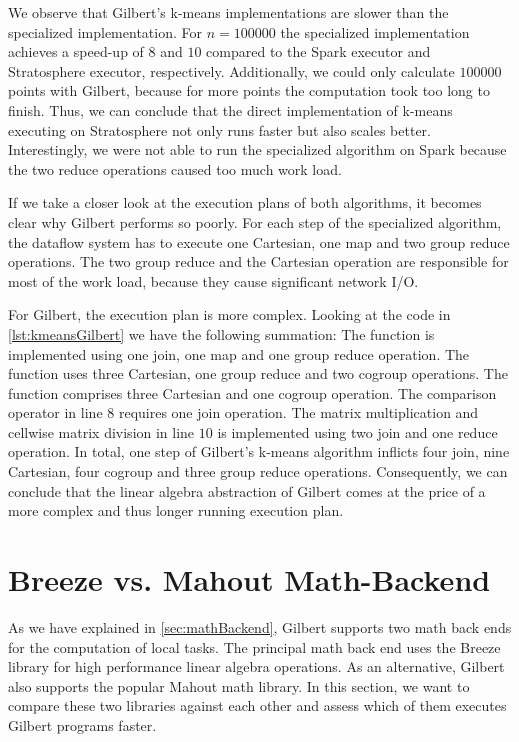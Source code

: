 We observe that Gilbert's k-means implementations are slower than the specialized implementation.
For $n=100000$ the specialized implementation achieves a speed-up of $8$ and $10$ compared to the Spark executor and Stratosphere executor, respectively.
Additionally, we could only calculate $100000$ points with Gilbert, because for more points the computation took too long to finish.
Thus, we can conclude that the direct implementation of k-means executing on Stratosphere not only runs faster but also scales better.
Interestingly, we were not able to run the specialized algorithm on Spark because the two reduce operations caused too much work load.

If we take a closer look at the execution plans of both algorithms, it becomes clear why Gilbert performs so poorly.
For each step of the specialized algorithm, the dataflow system has to execute one Cartesian, one map and two group reduce operations.
The two group reduce and the Cartesian operation are responsible for most of the work load, because they cause significant network I/O.

For Gilbert, the execution plan is more complex.
Looking at the code in \cref{lst:kmeansGilbert} we have the following summation:
The  function is implemented using one join, one map and one group reduce operation.
The  function uses three Cartesian, one group reduce and two cogroup operations.
The  function comprises three Cartesian and one cogroup operation.
The comparison operator in line $8$ requires one join operation.
The matrix multiplication and cellwise matrix division in line $10$ is implemented using two join and one reduce operation.
In total, one step of Gilbert's k-means algorithm inflicts four join, nine Cartesian, four cogroup and three group reduce operations.
Consequently, we can conclude that the linear algebra abstraction of Gilbert comes at the price of a more complex and thus longer running execution plan.

\section{Breeze vs. Mahout Math-Backend}

As we have explained in \cref{sec:mathBackend}, Gilbert supports two math back ends for the computation of local tasks.
The principal math back end uses the Breeze library for high performance linear algebra operations.
As an alternative, Gilbert also supports the popular Mahout math library.
In this section, we want to compare these two libraries against each other and assess which of them executes Gilbert programs faster.

